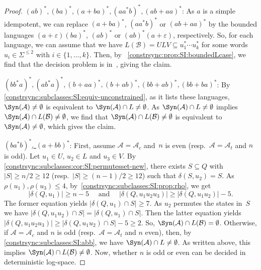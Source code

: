\begin{proof}
    \medskip
    \noindent\underline{$(ab)^*, (ba)^*, (a+ba)^*, (aa^*b)^*, (ab+aa)^*$}:
       As $a$ is a simple idempotent,
       we can replace $(a+ba)^*$, $(aa^*b)^*$
       or $(ab+aa)^*$ by the bounded languages
       $(a+\varepsilon)(ba)^*$, $(ab)^*$
       or $(ab)^*(a+\varepsilon)$, respectively.
       So, for each language, 
       we can assume that we have $L(\mathcal B) = ULV \subseteq u_1^* \cdots u_k^*$
       for some words $u_i \in \Sigma^{\le 2}$ with $i \in \{1,\ldots,k\}$.
       Then, by \PROP~\ref{constrsync:prop:SI:boundedLcase},
       we find that the decision problem is in~\LOGSPACE, giving the claim.
    
    \medskip
    \noindent\underline{$(bb^*a)^*, (ab^*a)^*, (b+aa)^*, (b+ab)^*, (bb+ab)^*, (bb+ba)^*$}:
    By \cref{constrsync:subclasses:SI:equiv-unconstrained},
    as it lists these languages, $\Syn(\mathcal A) \ne \emptyset$
    is equivalent to $\Syn(\mathcal A) \cap L \ne \emptyset$. 
    As $\Syn(\mathcal A) \cap L \ne \emptyset$
    implies $\Syn(\mathcal A) \cap L(\mathcal B) \ne \emptyset$,
    we find that $\Syn(\mathcal A) \cap L(\mathcal B) \ne \emptyset$
    is equivalent to $\Syn(\mathcal A) \ne \emptyset$,
    which gives the claim.       

    \medskip
    \noindent\underline{$(ba^*b)^*$, $(a+bb)^*$}:
    First, assume $\mathcal A = \mathcal A_c$ and~$n$
    is even (resp.~$\mathcal A = \mathcal A_t$ and $n$ is odd).
    Let  $u_1 \in U$, $u_2 \in L$ 
    and $u_3 \in V$. 
    By \cref{constrsync:subclasses:cor:SI:permutesset-new},
    there exists $S \subseteq Q$
    with $|S| \ge n/2 \ge 12$ (resp.~$|S| \ge (n-1)/2 \ge 12$)
    such that $\delta(S, u_2) = S$.
    As $\rho(u_1), \rho(u_3) \le 4$, by~\cref{constrsync:subclasses:SI:prop:rho},
    we get
    \[
    |\delta(Q, u_1)| \ge n - 5 \quad\text{ and }\quad 
    |\delta(Q, u_1 u_2 u_3)| \ge |\delta(Q, u_1 u_2)| - 5.
    \]
    The former equation yields $|\delta(Q, u_1) \cap S| \ge 7$.
    As $u_2$ permutes the states in~$S$
    we have $|\delta(Q, u_1u_2) \cap S| = |\delta(Q, u_1) \cap S|$.
    Then the latter equation yields $|\delta(Q, u_1 u_2 u_3)| \ge |\delta(Q, u_1 u_2) \cap S| - 5 \ge 2$.
    So, $\Syn(\mathcal A) \cap L(\mathcal B) = \emptyset$.    
    Otherwise, if $\mathcal A = \mathcal A_c$ and $n$ is odd
    (resp.~$\mathcal A = \mathcal A_t$ and $n$ even),
    then, by \cref{constrsync:subclasses:SI:abb},
    we have $\Syn(\mathcal A) \cap L \ne \emptyset$.
    As written above, this implies $\Syn(\mathcal A) \cap L(\mathcal B) \ne \emptyset$.
    Now, whether $n$ is odd or even can be decided 
    in deterministic log-space.    
\end{proof}

